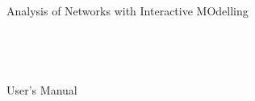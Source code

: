 \documentclass{article}
\begin{document}
\pagestyle{plain}

\clearpage

\thispagestyle{empty}
\ \\ \ \\ \ \\ \ \\ \ \\
\begin{center}
  \\ 
  {\huge\sf Analysis of Networks with Interactive MOdelling}\\\ \\ \ \\ \ \\ \ \\
 {\Huge User's Manual}
\end{center}
\clearpage






\makeatletter
\end{document}
